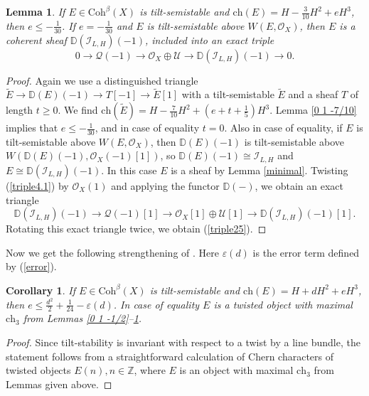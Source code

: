 \documentclass{amsart}
\newtheorem{lemma}[theorem]{Lemma}
\newtheorem{corollary}[theorem]{Corollary}
\begin{document}
	\begin{lemma}\label{0 1 -3/10} If $E\in\mathrm{Coh}^\beta(X)$ is tilt-semistable and $\mathrm{ch}(E)=H-\frac{3}{10}H^2+eH^3$, then $e\le-\frac{1}{30}$. If $e=-\frac{1}{30}$ and $E$ is tilt-semistable above $W(E,\mathcal O_X)$, then $E$ is a coherent sheaf $\mathbb D(\mathcal I_{L,H})(-1)$, included into an exact triple
	\begin{equation}\label{triple25}0\to\mathcal Q(-1)\to\mathcal O_X\oplus\mathcal U\to \mathbb D(\mathcal I_{L,H})(-1)\to 0.
	\end{equation}
	\end{lemma}
	
	\begin{proof}Again we use a distinguished triangle $\widetilde{E}\to\mathbb D(E)(-1)\to T[-1]\to\widetilde{E}[1]$ with a tilt-semistable $\widetilde{E}$ and a sheaf $T$ of length $t\ge 0$. We find $\mathrm{ch}(\widetilde{E})=H-\frac{7}{10}H^2+(e+t+\frac 15)H^3$. Lemma \ref{0 1 -7/10} implies that $e\le-\frac{1}{30}$, and in case of equality $t=0$. Also in case of equality, if $E$ is tilt-semistable above $W(E,\mathcal O_X)$, then $\mathbb D(E)(-1)$ is tilt-semistable above $W(\mathbb D(E)(-1),\mathcal O_X(-1)[1])$, so $\mathbb D(E)(-1)\cong\mathcal I_{L,H}$ and $E\cong\mathbb D(\mathcal I_{L,H})(-1)$. In this case $E$ is a sheaf by Lemma \ref{minimal}.
    Twisting (\ref{triple4.1}) by $\mathcal O_X(1)$ and applying the functor $\mathbb D(-)$, we obtain an exact triangle
	\begin{equation}\label{triple25.2}\mathbb D(\mathcal I_{L,H})(-1)\to\mathcal Q(-1)[1]\to\mathcal O_X[1]\oplus\mathcal U[1]\to\mathbb D(\mathcal I_{L,H})(-1)[1].
	\end{equation}
	Rotating this exact triangle twice, we obtain (\ref{triple25}).
	\end{proof}
	
	Now we get the following strengthening of \cite[Lemma 4.1]{Vass}. Here $\varepsilon(d)$ is the error term defined by (\ref{error}).
	
	\begin{corollary}\label{0 1}If $E\in\mathrm{Coh}^\beta(X)$ is tilt-semistable and $\mathrm{ch}(E)=H+dH^2+eH^3$, then $e\le\frac{d^2}{2}+\frac{1}{24}-\varepsilon(d)$. In case of equality $E$ is a twisted object with maximal $\mathrm{ch}_3$ from Lemmas \ref{0 1 -1/2}--\ref{0 1 -3/10}.
	\end{corollary}
	
	\begin{proof} Since tilt-stability is invariant with respect to a twist by a line bundle, the statement follows from a straightforward calculation of Chern characters of twisted objects $E(n),n\in\mathbb Z$, where $E$ is an object with maximal $\mathrm{ch}_3$ from Lemmas given above.
	\end{proof}
	
\end{document}
